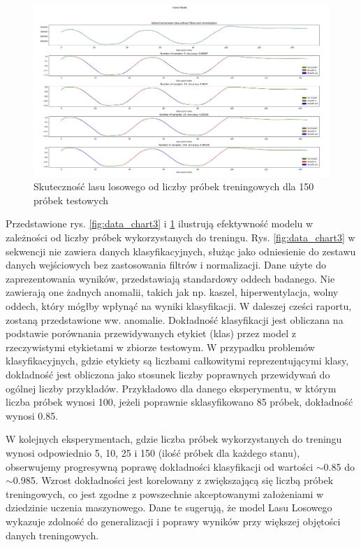 \documentclass{article}
\begin{document}
\begin{figure}[H]
    \centering
    \includegraphics[width=\textwidth]{las_losowy/jak_sobie_radzi_las_losowy_2.png}
    \caption{Skuteczność lasu losowego od liczby próbek treningowych dla 150 próbek testowych}
    \label{fig:data_chart4}
\end{figure}

Przedstawione rys. \ref{fig:data_chart3} i \ref{fig:data_chart4} ilustrują efektywność modelu w zależności od liczby próbek wykorzystanych do treningu. Rys. \ref{fig:data_chart3} w sekwencji nie zawiera danych klasyfikacyjnych, służąc jako odniesienie do zestawu danych wejściowych bez zastosowania filtrów i normalizacji. Dane użyte do zaprezentowania wyników, przedstawiają standardowy oddech badanego. Nie zawierają one żadnych anomalii, takich jak np. kaszel, hiperwentylacja, wolny oddech, który mógłby wpłynąć na wyniki klasyfikacji. W daleszej cześci raportu, zostaną przedstawione ww. anomalie. Dokładność klasyfikacji jest obliczana na podstawie porównania przewidywanych etykiet (klas) przez model z rzeczywistymi etykietami w zbiorze testowym. W przypadku problemów klasyfikacyjnych, gdzie etykiety są liczbami całkowitymi reprezentującymi klasy, dokładność jest obliczona jako stosunek liczby poprawnych przewidywań do ogólnej liczby przykładów. Przykładowo dla danego eksperymentu, w którym liczba próbek wynosi 100, jeżeli poprawnie sklasyfikowano 85 próbek, dokładność wynosi 0.85.


W kolejnych eksperymentach, gdzie liczba próbek wykorzystanych do treningu wynosi odpowiednio 5, 10, 25 i 150 (ilość próbek dla każdego stanu), obserwujemy progresywną poprawę dokładności klasyfikacji od wartości $\sim$0.85 do $\sim$0.985. Wzrost dokładności jest korelowany z zwiększającą się liczbą próbek treningowych, co jest zgodne z powszechnie akceptowanymi założeniami w dziedzinie uczenia maszynowego. Dane te sugerują, że model Lasu Losowego wykazuje zdolność do generalizacji i poprawy wyników przy większej objętości danych treningowych.
\end{document}

